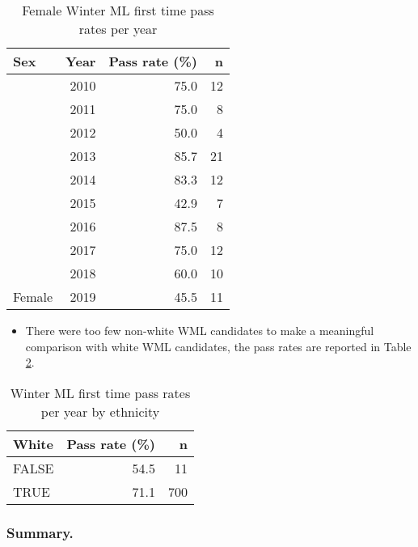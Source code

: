 \documentclass[
  12pt,
  a4paper,
]{book}
\providecommand{\tightlist}{%
  \setlength{\itemsep}{0pt}\setlength{\parskip}{0pt}}
\begin{document}
\begin{table}

\caption{\label{tab:wml-ftp-tab-sex}Female Winter ML first time pass rates per year}
\centering
\begin{tabular}[t]{lrrr}
\toprule
Sex & Year & Pass 
rate (\%) & n\\
\midrule
 & 2010 & 75.0 & 12\\
\cmidrule{2-4}
 & 2011 & 75.0 & 8\\
\cmidrule{2-4}
 & 2012 & 50.0 & 4\\
\cmidrule{2-4}
 & 2013 & 85.7 & 21\\
\cmidrule{2-4}
 & 2014 & 83.3 & 12\\
\cmidrule{2-4}
 & 2015 & 42.9 & 7\\
\cmidrule{2-4}
 & 2016 & 87.5 & 8\\
\cmidrule{2-4}
 & 2017 & 75.0 & 12\\
\cmidrule{2-4}
 & 2018 & 60.0 & 10\\
\cmidrule{2-4}
\multirow[t]{-10}{*}{\raggedright\arraybackslash Female} & 2019 & 45.5 & 11\\
\bottomrule
\end{tabular}
\end{table}

\begin{itemize}
\tightlist
\item
  There were too few non-white WML candidates to make a meaningful comparison with white WML candidates, the pass rates are reported in Table \ref{tab:wml-ftp-tab-ethnicity}.
\end{itemize}

\begin{table}

\caption{\label{tab:wml-ftp-tab-ethnicity}Winter ML first time pass rates per year by ethnicity}
\centering
\begin{tabular}[t]{lrr}
\toprule
White & Pass 
rate (\%) & n\\
\midrule
FALSE & 54.5 & 11\\
\cmidrule{1-3}
TRUE & 71.1 & 700\\
\bottomrule
\end{tabular}
\end{table}

\hypertarget{mts-part-a-summary}{%
\subsubsection{Summary.}\label{mts-part-a-summary}}
\end{document}
